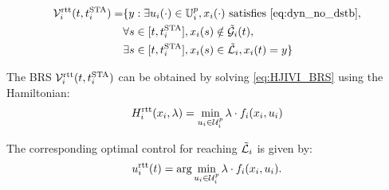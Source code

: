 \begin{equation}
\label{eq:rttBRS}
\begin{aligned}
\mathcal{V}_i^\text{rtt}(t, t^\text{STA}_i) = & \{y: \exists u_i(\cdot) \in \mathbb{U}^p_i, x_i(\cdot) \text{ satisfies \eqref{eq:dyn_no_dstb}},\\
&\forall s \in [t, t^\text{STA}_i], x_i(s) \notin \tilde{\mathcal{G}}_i(t), \\
& \exists s \in [t, t^\text{STA}_i], x_i(s) \in \tilde{\mathcal{L}}_i, x_i(t) = y\}
\end{aligned}
\end{equation}

The BRS $\mathcal{V}_i^\text{rtt}(t, t^\text{STA}_i)$ can be obtained by solving \eqref{eq:HJIVI_BRS} using the Hamiltonian: 
\begin{equation}
\label{eq:RTTham}
H_i^\text{rtt}(x_i, \lambda) = \min_{u_i \in \mathcal{U}^p_i } \lambda \cdot f_i(x_i, u_i)
\end{equation}

The corresponding optimal control for reaching $\tilde{\mathcal{L}}_i$ is given by:
\begin{equation}
\label{eq:RTTOptCtrl}
u_i^\text{rtt}(t) = \arg \min_{u_i \in \mathcal{U}^p_i } \lambda \cdot f_i(x_i, u_i).
\end{equation}

